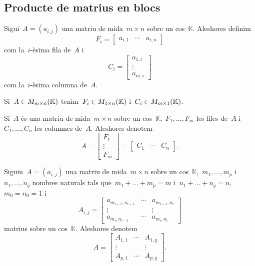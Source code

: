 \documentclass[../../main.tex]{subfiles}
\begin{document}
	\subsection{Producte de matrius en blocs}%
	\begin{definition}
		\label{def:fila d'una matriu}
		\label{def:columna d'una matriu}
		Sigui~\(A=(a_{i,j})\) una matriu de mida~\(m\times n\) sobre un cos~\(\mathbb{K}\).
		Aleshores definim
		\[F_{i}=\left[\begin{matrix}
		a_{i,1} & \cdots & a_{i,n}
		\end{matrix}\right]\]
		com la~\(i\)-èsima fila de~\(A\) i
		\[C_{i}=\left[\begin{matrix}
		a_{1,i} \\
		\vdots \\
		a_{m,i}
		\end{matrix}\right]\]
		com la~\(i\)-èsima columna de~\(A\).
	\end{definition}
	\begin{observation}
		\label{obs:on pertanyen les files i les columnes d'una matriu}
		Si~\(A\in M_{m\times n}(\mathbb{K})\) tenim~\(F_{i}\in M_{1\times n}(\mathbb{K})\) i~\(C_{i}\in M_{m\times 1}(\mathbb{K})\).
	\end{observation}
	\begin{notation}
		Si~\(A\) és una matriu de mida~\(m\times n\) sobre un cos~\(\mathbb{K}\),~\(F_{1},\dots,F_{m}\) les files de~\(A\) i~\(C_{1},\dots,C_{n}\) les columnes de~\(A\).
		Aleshores denotem
		\[A=\left[\begin{matrix}
		F_{1} \\
		\vdots \\
		F_{m}
		\end{matrix}\right]=\left[\begin{matrix}
		C_{1} & \cdots & C_{n}
		\end{matrix}\right].\]
	\end{notation}
	\begin{notation}
		Siguin~\(A=(a_{i,j})\) una matriu de mida~\(m\times n\) sobre un cos~\(\mathbb{K}\),~\(m_{1},\dots,m_{p}\) i~\(n_{1},\dots,n_{q}\) nombres naturals tals que~\(m_{1}+\dots+m_{p}=m\) i~\(n_{1}+\dots+n_{q}=n\),~\(m_{0}=n_{0}=1\) i
		\[A_{i,j}=\left[\begin{matrix}
		a_{m_{i-1},n_{i-1}} & \cdots & a_{m_{i-1},n_{i}}\\
		\vdots & & \vdots \\
		a_{m_{i},n_{i-1}} & \cdots & a_{m_{i},n_{i}}
		\end{matrix}\right]\]
		matrius sobre un cos~\(\mathbb{K}\).
		Aleshores denotem
		\[A=\left[\begin{matrix}
		A_{1,1} & \cdots & A_{1,q} \\
		\vdots & & \vdots \\
		A_{p,1} & \cdots & A_{p,q}
		\end{matrix}\right].\]
	\end{notation}
\end{document}
